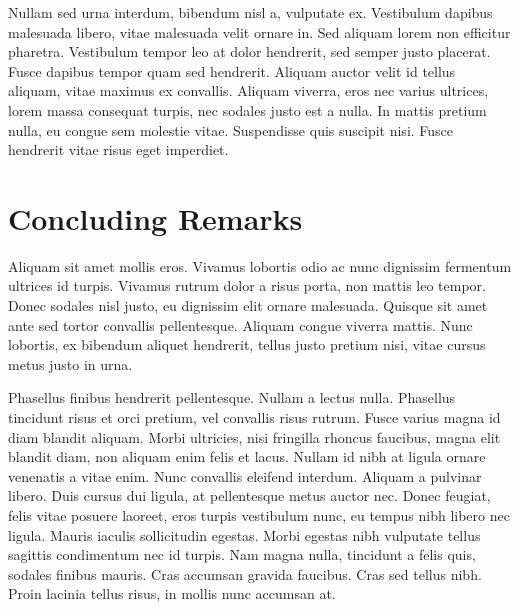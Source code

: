 Nullam sed urna interdum, bibendum nisl a, vulputate ex. Vestibulum dapibus malesuada libero, vitae malesuada velit ornare in. Sed aliquam lorem non efficitur pharetra. Vestibulum tempor leo at dolor hendrerit, sed semper justo placerat. Fusce dapibus tempor quam sed hendrerit. Aliquam auctor velit id tellus aliquam, vitae maximus ex convallis. Aliquam viverra, eros nec varius ultrices, lorem massa consequat turpis, nec sodales justo est a nulla. In mattis pretium nulla, eu congue sem molestie vitae. Suspendisse quis suscipit nisi. Fusce hendrerit vitae risus eget imperdiet.

\section{Concluding Remarks}

Aliquam sit amet mollis eros. Vivamus lobortis odio ac nunc dignissim fermentum ultrices id turpis. Vivamus rutrum dolor a risus porta, non mattis leo tempor. Donec sodales nisl justo, eu dignissim elit ornare malesuada. Quisque sit amet ante sed tortor convallis pellentesque. Aliquam congue viverra mattis. Nunc lobortis, ex bibendum aliquet hendrerit, tellus justo pretium nisi, vitae cursus metus justo in urna.

Phasellus finibus hendrerit pellentesque. Nullam a lectus nulla. Phasellus tincidunt risus et orci pretium, vel convallis risus rutrum. Fusce varius magna id diam blandit aliquam. Morbi ultricies, nisi fringilla rhoncus faucibus, magna elit blandit diam, non aliquam enim felis et lacus. Nullam id nibh at ligula ornare venenatis a vitae enim. Nunc convallis eleifend interdum. Aliquam a pulvinar libero. Duis cursus dui ligula, at pellentesque metus auctor nec. Donec feugiat, felis vitae posuere laoreet, eros turpis vestibulum nunc, eu tempus nibh libero nec ligula. Mauris iaculis sollicitudin egestas. Morbi egestas nibh vulputate tellus sagittis condimentum nec id turpis. Nam magna nulla, tincidunt a felis quis, sodales finibus mauris. Cras accumsan gravida faucibus. Cras sed tellus nibh. Proin lacinia tellus risus, in mollis nunc accumsan at.